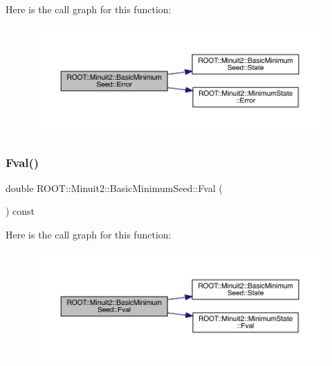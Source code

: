 Here is the call graph for this function\+:
\nopagebreak
\begin{figure}[H]
\begin{center}
\leavevmode
\includegraphics[width=350pt]{de/d50/classROOT_1_1Minuit2_1_1BasicMinimumSeed_a108de61cfe9f1766c3d7e251202a29df_cgraph}
\end{center}
\end{figure}
\mbox{\label{classROOT_1_1Minuit2_1_1BasicMinimumSeed_a40b43b611717121256cd72bf40a3d5d7}} 
\subsubsection{\texorpdfstring{Fval()}{Fval()}\hspace{0.1cm}{\footnotesize\ttfamily [1/3]}}
{\footnotesize\ttfamily double R\+O\+O\+T\+::\+Minuit2\+::\+Basic\+Minimum\+Seed\+::\+Fval (\begin{DoxyParamCaption}{ }\end{DoxyParamCaption}) const\hspace{0.3cm}{\ttfamily [inline]}}

Here is the call graph for this function\+:
\nopagebreak
\begin{figure}[H]
\begin{center}
\leavevmode
\includegraphics[width=350pt]{de/d50/classROOT_1_1Minuit2_1_1BasicMinimumSeed_a40b43b611717121256cd72bf40a3d5d7_cgraph}
\end{center}
\end{figure}
\mbox{\label{classROOT_1_1Minuit2_1_1BasicMinimumSeed_a40b43b611717121256cd72bf40a3d5d7}} 
